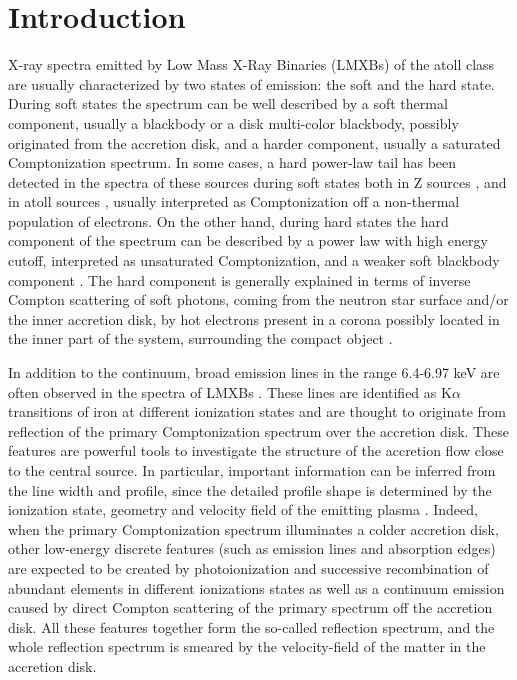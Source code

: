 \documentclass{aa}
\begin{document}
\section{Introduction}
\label{sec:intro}
X-ray spectra emitted by Low Mass X-Ray Binaries (LMXBs) of the atoll 
class \citep{Hasinger.etal:89} are usually characterized by two states 
of emission: the soft and the hard state. 
During soft states the spectrum can be well described by a 
soft thermal component, usually a blackbody or a disk multi-color 
blackbody, possibly originated from the accretion disk, and a harder
component, usually a saturated Comptonization spectrum. In some cases, 
a hard power-law tail has been detected in the spectra of these sources
during soft states both in Z sources \citep{DiSalvo.et:00}, and in atoll 
sources \citep[e.g.,][]{Piraino.etal:07}, usually interpreted as 
Comptonization off a non-thermal population of electrons. On the other 
hand, during hard states the hard component of the spectrum can be 
described by a power law with high energy cutoff, interpreted as unsaturated 
Comptonization, and a weaker soft blackbody component 
\citep[e.g.,][]{DiSalvo.etal:15}. The hard component 
is generally explained in terms of inverse Compton scattering of soft 
photons, coming from the neutron star surface and/or the inner accretion 
disk, by hot electrons present in a corona possibly located in the inner
part of the system, surrounding the compact object \citep{DAi.etal:10}. 

In addition to the continuum, broad emission lines in the range 6.4-6.97 
keV are often observed in the spectra of LMXBs \citep[see e.g.][]{Cackett.etal:08, 
Pandel.etat:08, DAi.etal:09, DAi.etal:10, Iaria.etal:09, DiSalvo.etal:05, 
DiSalvo.etal:09, Egron.etal:13, DiSalvo.etal:15}. These lines are 
identified as K$\alpha$ transitions of iron at different ionization 
states and are thought to originate from reflection of the primary 
Comptonization spectrum over the accretion disk. 
These features are powerful tools to investigate the structure of the 
accretion flow close to the central source. In particular, important 
information can be inferred from the line width and profile, since the 
detailed profile shape is determined by the ionization state, geometry 
and velocity field of the emitting plasma \citep[see e.g.][]{Fabian.etal:89}.
Indeed, when the primary Comptonization spectrum illuminates a colder 
accretion disk, other low-energy discrete features (such as emission lines
and absorption edges) are expected to be created by photoionization and 
successive recombination of abundant elements in different ionizations states 
as well as a continuum emission caused by direct Compton scattering of the
primary spectrum off the accretion disk. All these features together 
form the so-called reflection spectrum, and the whole reflection spectrum 
is smeared by the velocity-field of the matter in the accretion disk.
\end{document}
